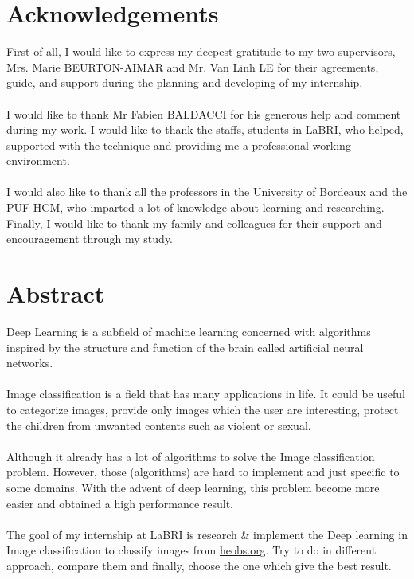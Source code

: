 \documentclass[hidelinks,12pt,a4paper]{report}
\begin{document}
\chapter*{Acknowledgements}

First of all, I would like to express my deepest gratitude to my two supervisors, Mrs. Marie BEURTON-AIMAR and Mr. Van Linh LE for their agreements, guide, and support during the planning and developing of my internship.
\\
\\
I would like to thank Mr Fabien BALDACCI for his generous help and comment during my work. I would like to thank the staffs, students in LaBRI, who helped, supported with the technique and providing me a professional working environment.
\\
\\
I would also like to thank all the professors in the University of Bordeaux and the PUF-HCM, who imparted a lot of knowledge about learning and researching. Finally, I would like to thank my family and colleagues for their support and encouragement through my study.

\clearpage

\chapter*{Abstract}

Deep Learning is a subfield of machine learning concerned with algorithms inspired by the structure and function of the brain called artificial neural networks.
\\
\\
Image classification is a field that has many applications in life. It could be useful to categorize images, provide only images which the user are interesting, protect the children from unwanted contents such as violent or sexual. 
\\
\\
Although it already has a lot of algorithms to solve the Image classification problem. However, those (algorithms) are hard to implement and just specific to some domains. With the advent of deep learning, this problem become more easier and obtained a high performance result\cite{o.a.b.penattik.nogueiraj.a.dossantos2015}.
\\
\\
The goal of my internship at LaBRI is research \& implement the Deep learning in Image classification to classify images from \href{https://heobs.org}{heobs.org}. Try to do in different approach, compare them and finally, choose the one which give the best result.
\tableofcontents
\listoffigures
\thispagestyle{empty}
\clearpage
\end{document}
